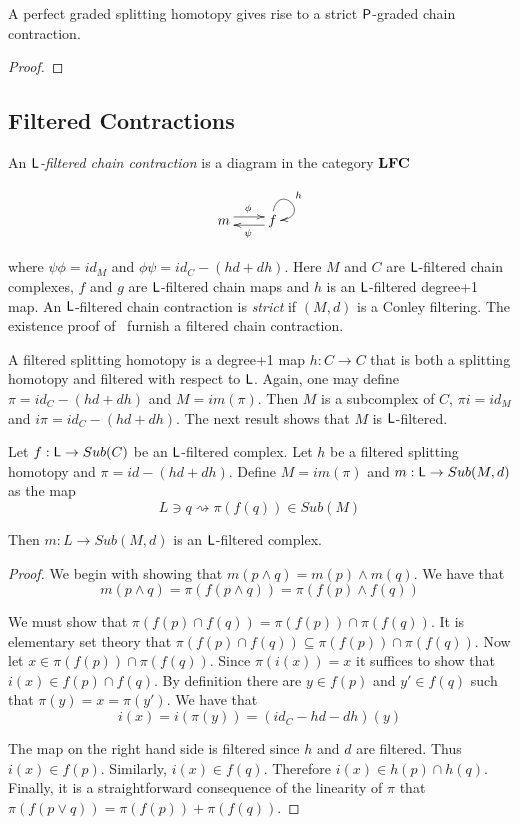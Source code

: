 \begin{cor}
A perfect graded splitting homotopy gives rise to a strict ${\mathsf P}$-graded chain contraction.
\end{cor}
\begin{proof}

\end{proof}

\subsection{Filtered Contractions}
 
An {\em ${\mathsf L}$-filtered chain contraction} is a diagram in the category ${\bf LFC}$ 

\[
\xymatrixrowsep{0.03in}
\xymatrixcolsep{0.3in}
\xymatrix{
m  \ar[r]<3pt>^{\phi} & \ar[l]<3pt>^{\psi} f \ar@(u,r)^{h}
}
\]

where $\psi\phi = id_M$ and $\phi\psi = id_C-(hd+dh)$.  Here  $M$ and $C$ are ${\mathsf L}$-filtered chain complexes, $f$ and $g$ are ${\mathsf L}$-filtered chain maps and $h$ is an ${\mathsf L}$-filtered degree+1 map.  An ${\mathsf L}$-filtered chain contraction is {\em strict} if $(M,d)$ is a Conley filtering.  The existence proof of~\cite{salamon}  furnish a filtered chain contraction.  

A filtered splitting homotopy is a degree+1 map $h:C\to C$ that is both a splitting homotopy and filtered with respect to ${\mathsf L}$.  Again, one may define $\pi=id_C-(hd+dh)$ and $M=im(\pi)$.  Then $M$ is a subcomplex of $C$, $\pi i = id_M$ and $i\pi = id_C-(hd+dh)$.  The next result shows that $M$ is ${\mathsf L}$-filtered. 

\begin{prop}
Let $f:{\mathsf L}\to Sub(C)$ be an ${\mathsf L}$-filtered complex.  Let $h$ be a filtered splitting homotopy and $\pi = id-(hd+dh)$.  Define $M=im(\pi)$ and $m:{\mathsf L}\to Sub(M,d)$ as the map $$L\ni q\rightsquigarrow  \pi(f(q))\in Sub(M)$$

Then $m:L\to Sub(M,d)$ is an ${\mathsf L}$-filtered complex.
\end{prop}
\begin{proof}
We begin with showing that $m(p \wedge q) = m(p)\wedge m(q)$.  We have that $$m(p\wedge q) = \pi(f(p\wedge q)) = \pi(f(p)\wedge f(q))$$

We must show that $\pi(f(p)\cap f(q)) = \pi(f(p))\cap \pi(f(q))$.  It is elementary set theory that $\pi(f(p)\cap f(q))\subseteq \pi(f(p))\cap \pi(f(q))$.  Now let $x\in \pi(f(p))\cap \pi(f(q))$.  Since $\pi(i(x))=x$ it suffices to show that $i(x)\in f(p)\cap f(q)$.  By definition there are $y\in f(p)$ and $y'\in f(q)$ such that $\pi(y) = x = \pi(y')$.  We have that $$i(x) = i(\pi(y)) = (id_C-hd - dh)(y)$$

The map on the right hand side is filtered since $h$ and $d$ are filtered.  Thus $i(x)\in f(p)$.  Similarly, $i(x)\in f(q)$.  Therefore $i(x)\in h(p)\cap h(q)$.  Finally, it is a straightforward consequence of the linearity of $\pi$ that $\pi(f(p\vee q)) = \pi(f(p))+\pi(f(q))$.


\end{proof}

